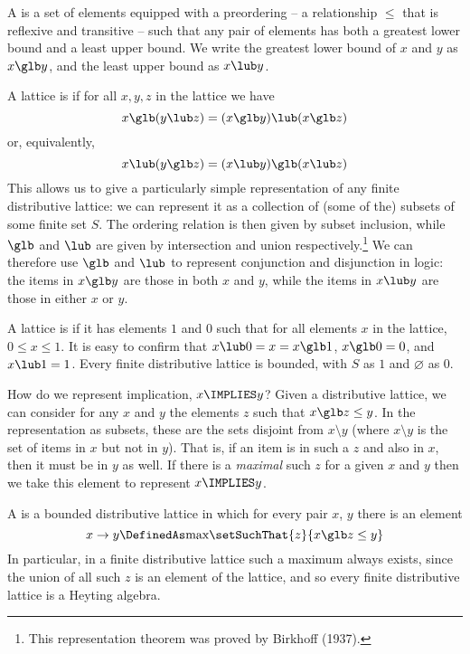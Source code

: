 A  is a set of elements equipped with a preordering -- a relationship $\leq$ that is reflexive and transitive -- such that any pair of elements has both a greatest lower bound and a least upper bound.  We write the greatest lower bound of $x$ and $y$ as $x \glb y$, and the least upper bound as $x \lub y$.

A lattice is  if for all $x, y, z$ in the lattice we have
\[
x \glb (y \lub z) = (x \glb y) \lub (x \glb z)
\]
or, equivalently,
\[
x \lub (y \glb z) = (x \lub y) \glb (x \lub z)
\]
This allows us to give a particularly simple representation of any finite distributive lattice: we can represent it as a collection of (some of the) subsets of some finite set $S$.  The ordering relation is then given by subset inclusion, while $\glb$ and $\lub$ are given by intersection and union respectively.\footnote{This representation theorem was proved by Birkhoff (1937).
}  We can therefore use $\glb$ and $\lub$ to represent conjunction and disjunction in logic: the items in $x \glb y$ are those in both $x$ and $y$, while the items in $x \lub y$ are those in either $x$ or $y$.

A lattice is  if it has elements $1$ and $0$ such that for all elements $x$ in the lattice, $0 \leq x \leq 1$.  It is easy to confirm that $x \lub 0 = x = x \glb 1$, $x \glb 0 = 0$, and $x \lub 1 = 1$.  Every finite distributive lattice is bounded, with $S$ as $1$ and $\varnothing$ as $0$.

How do we represent implication, $x \IMPLIES y$?  Given a distributive lattice, we can consider for any $x$ and $y$ the elements $z$ such that $x \glb z \leq y$.  In the representation as subsets, these are the sets disjoint from $x \setminus y$
(where $x \setminus y$ is the set of items in $x$ but not in $y$).  That is, if an item is in such a $z$ and also in $x$, then it must be in $y$ as well.  If there is a \emph{maximal} such $z$ for a given $x$ and $y$ then we take this element to represent $x \IMPLIES y$.  

A  is a bounded distributive lattice in which for every pair $x$, $y$ there is an element 
\[
x \to y \DefinedAs \mbox{max}\setSuchThat{z}{x \glb z \leq y}
\]
In particular, in a finite distributive lattice such a maximum always exists, since the union of all such $z$ is an element of the lattice, and so every finite distributive lattice is a Heyting algebra.

